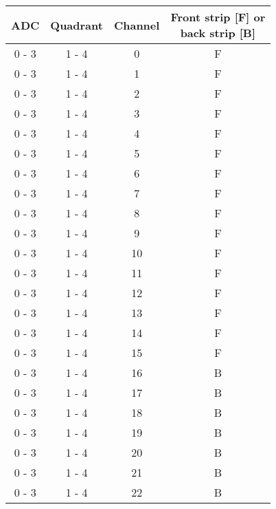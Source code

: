 \begin{tabular}{cccc}
\hline
ADC    & Quadrant & Channel &  \shortstack{Front strip [F] or \\ back strip [B]} \\
\hline
0 - 3  &  1 - 4   &  0      &  F                    		   					 \\
0 - 3  &  1 - 4   &  1      &  F                    		   					 \\
0 - 3  &  1 - 4   &  2      &  F                    		   					 \\
0 - 3  &  1 - 4   &  3      &  F                    		   					 \\
0 - 3  &  1 - 4   &  4      &  F                    		   					 \\
0 - 3  &  1 - 4   &  5      &  F                    		   					 \\
0 - 3  &  1 - 4   &  6      &  F                    		   					 \\
0 - 3  &  1 - 4   &  7      &  F                    		   					 \\
0 - 3  &  1 - 4   &  8      &  F                    		   					 \\
0 - 3  &  1 - 4   &  9      &  F                    		   					 \\
0 - 3  &  1 - 4   &  10     &  F                    		   					 \\
0 - 3  &  1 - 4   &  11     &  F                    		   					 \\
0 - 3  &  1 - 4   &  12     &  F                    		   					 \\
0 - 3  &  1 - 4   &  13     &  F                    		   					 \\
0 - 3  &  1 - 4   &  14     &  F                    		   					 \\
0 - 3  &  1 - 4   &  15     &  F                    		   					 \\
0 - 3  &  1 - 4   &  16     &  B                    		   					 \\
0 - 3  &  1 - 4   &  17     &  B                    		   					 \\
0 - 3  &  1 - 4   &  18     &  B                    		   					 \\
0 - 3  &  1 - 4   &  19     &  B                    		   					 \\
0 - 3  &  1 - 4   &  20     &  B                    		   					 \\
0 - 3  &  1 - 4   &  21     &  B                    		   					 \\
0 - 3  &  1 - 4   &  22     &  B                    		   					 \\

\end{tabular}
